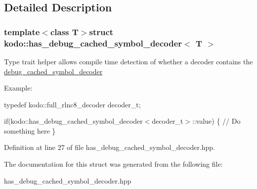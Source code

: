 \subsection{Detailed Description}
\subsubsection*{template$<$class T$>$struct kodo\-::has\-\_\-debug\-\_\-cached\-\_\-symbol\-\_\-decoder$<$ T $>$}

Type trait helper allows compile time detection of whether a decoder contains the \hyperlink{classkodo_1_1debug__cached__symbol__decoder}{debug\-\_\-cached\-\_\-symbol\-\_\-decoder}

Example\-:

typedef kodo\-::full\-\_\-rlnc8\-\_\-decoder decoder\-\_\-t;

if(kodo\-::has\-\_\-debug\-\_\-cached\-\_\-symbol\-\_\-decoder$<$decoder\-\_\-t$>$\-::value) \{ // Do something here \} 

Definition at line 27 of file has\-\_\-debug\-\_\-cached\-\_\-symbol\-\_\-decoder.\-hpp.



The documentation for this struct was generated from the following file\-:\begin{DoxyCompactItemize}
\item 
has\-\_\-debug\-\_\-cached\-\_\-symbol\-\_\-decoder.\-hpp\end{DoxyCompactItemize}
